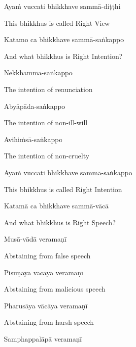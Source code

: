 Ayaṁ vuccati bhikkhave sammā-diṭṭhi

\begin{cprenglish}
This bhikkhus is called Right View
\end{cprenglish}

Katamo ca bhikkhave sammā-saṅkappo

\begin{cprenglish}
And what bhikkhus is Right Intention?
\end{cprenglish}

Nekkhamma-saṅkappo

\begin{cprenglish}
The intention of renunciation
\end{cprenglish}

Abyāpāda-saṅkappo

\begin{cprenglish}
The intention of non-ill-will
\end{cprenglish}

Avihiṁsā-saṅkappo

\begin{cprenglish}
The intention of non-cruelty
\end{cprenglish}

Ayaṁ vuccati bhikkhave sammā-saṅkappo

\begin{cprenglish}
This bhikkhus is called Right Intention
\end{cprenglish}

Katamā ca bhikkhave sammā-vācā

\begin{cprenglish}
And what bhikkhus is Right Speech?
\end{cprenglish}

Musā-vādā veramaṇī

\begin{cprenglish}
Abstaining from false speech
\end{cprenglish}

Pisuṇāya vācāya veramaṇī

\begin{cprenglish}
Abstaining from malicious speech
\end{cprenglish}

Pharusāya vācāya veramaṇī

\begin{cprenglish}
Abstaining from harsh speech
\end{cprenglish}

Samphappalāpā veramaṇī

